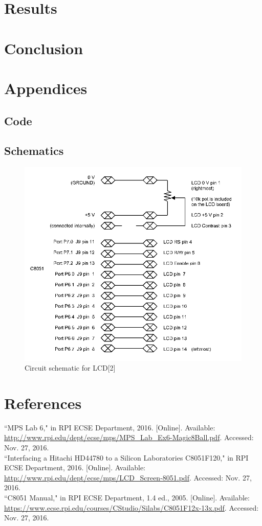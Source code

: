 \documentclass[12pt]{article}
\begin{document}
\section{Results}

\section{Conclusion}
 


\section{Appendices}
\subsection{Code}
	
\subsection{Schematics}
\begin{figure}[H]
	\centering
	\includegraphics[width=\textwidth]{lcd_schematic.png}
	\caption[]{Circuit schematic for LCD[2]}
	\label{LCD}
\end{figure}


\section{References} 
\noindent
[1]``MPS Lab 6," in RPI ECSE Department, 2016. [Online]. Available: \url{http://www.rpi.edu/dept/ecse/mps/MPS_Lab_Ex6-Magic8Ball.pdf}. Accessed: Nov. 27, 2016.\\
\newline\noindent
[2]``Interfacing a Hitachi HD44780 to a Silicon Laboratories C8051F120," in RPI ECSE Department, 2016. [Online]. Available: \url{http://www.rpi.edu/dept/ecse/mps/LCD_Screen-8051.pdf}. Accessed: Nov. 27, 2016.\\
\newline\noindent
[3]``C8051 Manual," in RPI ECSE Department, 1.4 ed., 2005. [Online]. Available: \url{https://www.ecse.rpi.edu/courses/CStudio/Silabs/C8051F12x-13x.pdf}. Accessed: Nov. 27, 2016.
\end{document}
